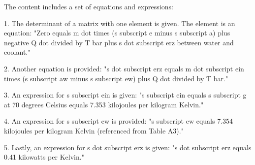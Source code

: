 The content includes a set of equations and expressions:

1. The determinant of a matrix with one element is given. The element is an equation:
   "Zero equals m dot times (s subscript e minus s subscript a) plus negative Q dot divided by T bar plus s dot subscript erz between water and coolant."

2. Another equation is provided:
   "s dot subscript erz equals m dot subscript ein times (s subscript aw minus s subscript ew) plus Q dot divided by T bar."

3. An expression for s subscript ein is given:
   "s subscript ein equals s subscript g at 70 degrees Celsius equals 7.353 kilojoules per kilogram Kelvin."

4. An expression for s subscript ew is provided:
   "s subscript ew equals 7.354 kilojoules per kilogram Kelvin (referenced from Table A3)."

5. Lastly, an expression for s dot subscript erz is given:
   "s dot subscript erz equals 0.41 kilowatts per Kelvin."